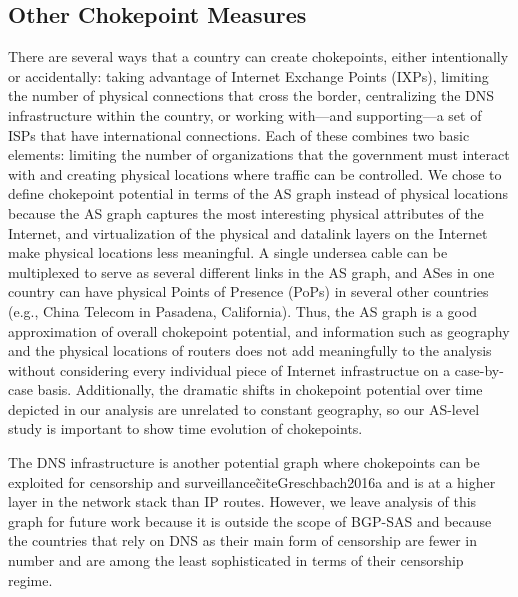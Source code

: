 \documentclass[10pt, conference, letterpaper]{IEEEtran}
\newcommand{\toolname}{BGP-SAS }
\begin{document}
\subsection{Other Chokepoint Measures}
There are several ways that a country can create chokepoints, either intentionally or accidentally: taking advantage of Internet Exchange Points (IXPs),
limiting the number of physical connections that cross the border, centralizing
the DNS infrastructure within the country, or working
with---and supporting---a set of ISPs that have international connections.
Each of these combines two basic elements: limiting the number of organizations that the government must interact with and creating physical locations where traffic can be controlled.
We chose to define chokepoint potential in terms of the AS graph instead of physical locations because the AS graph captures the most interesting physical attributes of the Internet, and
virtualization of the physical and datalink layers on the Internet make physical locations less meaningful. A single undersea cable can be multiplexed to serve as several different links in
the AS graph, and ASes in one country can have physical Points of Presence (PoPs) in several other countries (e.g., China Telecom in Pasadena, California). Thus, the AS graph is a good approximation
of overall chokepoint potential, and information such as geography and the physical locations of routers does not add meaningfully to the analysis without considering every individual piece of Internet
infrastructue on a case-by-case basis. Additionally, the dramatic shifts in chokepoint potential over time depicted in our analysis are unrelated to constant geography, so our AS-level study is important
to show time evolution of chokepoints.

The DNS infrastructure is another potential graph where chokepoints can be
exploited for censorship and surveillance\~cite{Greschbach2016a} and is at a
higher layer in the network stack than IP routes.  However, we leave analysis of
this graph for future work because it is outside the scope of \toolname and
because the countries that rely on DNS as their main form of censorship are
fewer in number and are among the least sophisticated in terms of their
censorship regime.
\end{document}
